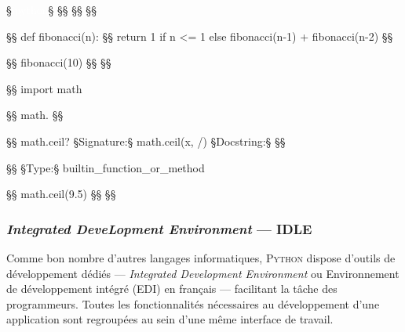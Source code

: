 \begin{fullwidth}
\begin{ipythonminted}
§\textcolor{white}{ipython}§
§§
§§
§§

§§ def fibonacci(n):
§\ipythonpromptdots§ return 1 if n <= 1 else fibonacci(n-1) + fibonacci(n-2)
§\ipythonpromptdots§

§§ fibonacci(10)
§§ §§

§§ import math

§§ math.
      §\ipythonmathfunctions§

§§ math.ceil?
§\textcolor{ipythonpromptoutcolor}{Signature:}§ math.ceil(x, /)
§\textcolor{ipythonpromptoutcolor}{Docstring:}§
§§

§§
§\textcolor{ipythonpromptoutcolor}{Type:}§      builtin_function_or_method

§§ math.ceil(9.5)
§§ §§
\end{ipythonminted}
\end{fullwidth}

\vspace*{6pt}

\subsubsection[IDLE]{\textit{Integrated DeveLopment Environment} --- IDLE}
\label{subsub:X.1.2.2}

Comme bon nombre d'autres langages informatiques, \textsc{Python} dispose d'outils de développement dédiés --- \textit{Integrated Development Environment} ou Environnement de développement intégré (EDI) en français --- facilitant la tâche des programmeurs. Toutes les fonctionnalités nécessaires au développement d'une application sont regroupées au sein d'une même interface de travail. 

